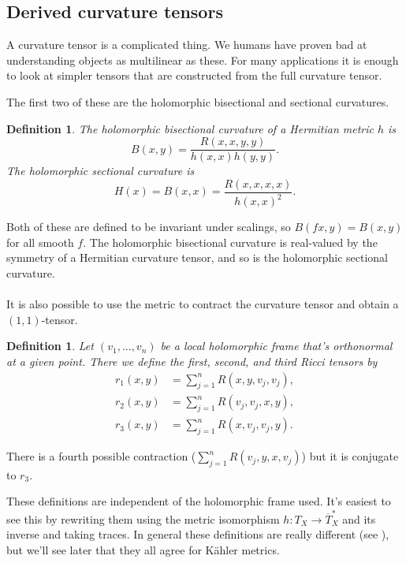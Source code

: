 \documentclass[10pt,a4paper]{article}
\newtheorem{defi}[theo]{Definition}
\begin{document}
\subsection{Derived curvature tensors}


A curvature tensor is a complicated thing. We humans have proven bad at understanding objects as multilinear as these. For many applications it is enough to look at simpler tensors that are constructed from the full curvature tensor.

The first two of these are the holomorphic bisectional and sectional curvatures.

\begin{defi}
  The \emph{holomorphic bisectional curvature} of a Hermitian metric $h$ is
$$
B(x,y) = \frac{R(x,x,y,y)}{h(x,x)h(y,y)}.
$$
The \emph{holomorphic sectional curvature} is
$$
H(x) = B(x,x) = \frac{R(x,x,x,x)}{h(x,x)^2}.
$$
\end{defi}

Both of these are defined to be invariant under scalings, so $B(fx,y) = B(x,y)$ for all smooth $f$. The holomorphic bisectional curvature is real-valued by the symmetry of a Hermitian curvature tensor, and so is the holomorphic sectional curvature.


\paragraph{}
It is also possible to use the metric to contract the curvature tensor and obtain a $(1,1)$-tensor.

\begin{defi}
  Let $(v_1, \ldots, v_n)$ be a local holomorphic frame that's orthonormal at a given point. There we define the \emph{first}, \emph{second}, and \emph{third Ricci tensors} by
\begin{align*}
r_1(x,y) &= \sum_{j=1}^n R(x,y,v_j,v_j),
\\
r_2(x,y) &= \sum_{j=1}^n R(v_j, v_j, x,y),
\\
r_3(x,y) &= \sum_{j=1}^n R(x,v_j,v_j,y).
\end{align*}
\end{defi}

There is a fourth possible contraction ($\sum_{j=1}^n R(v_j,y,x,v_j)$) but it is conjugate to $r_3$.

These definitions are independent of the holomorphic frame used. It's easiest to see this by rewriting them using the metric isomorphism $h : T_X \to \overline T_X^*$ and its inverse and taking traces. In general these definitions are really different (see ), but we'll see later that they all agree for K\"ahler metrics.
\end{document}

